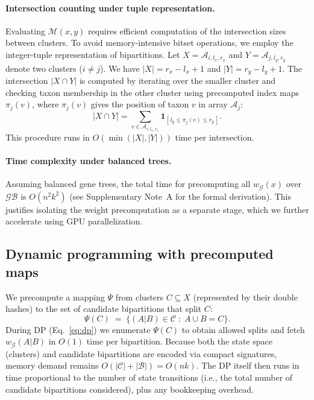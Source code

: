 \documentclass[10pt,a4paper]{article}
\begin{document}
\begin{enumerate}
\paragraph{Intersection counting under tuple representation.}
Evaluating $\mathcal{M}(x,y)$ requires efficient computation of the intersection sizes between clusters.  
To avoid memory-intensive bitset operations, we employ the integer-tuple representation of bipartitions.  
Let $X = \mathcal{A}_{i,l_x,r_x}$ and $Y = \mathcal{A}_{j,l_y,r_y}$ denote two clusters ($i \neq j$).  
We have $|X| = r_x - l_x + 1$ and $|Y| = r_y - l_y + 1$.  
The intersection $|X \cap Y|$ is computed by iterating over the smaller cluster and checking taxon membership in the other cluster using precomputed index maps $\pi_j(v)$, where $\pi_j(v)$ gives the position of taxon $v$ in array $\mathcal{A}_j$:
\[
|X \cap Y| = 
\sum_{v \in \mathcal{A}_{i,l_x,r_x}} 
\mathbf{1}_{[\,l_y \le \pi_j(v) \le r_y\,]}.
\]
This procedure runs in $O(\min(|X|, |Y|))$ time per intersection.

\paragraph{Time complexity under balanced trees.}
Assuming balanced gene trees, the total time for precomputing all $w_{\mathcal{G}}(x)$ over $\mathcal{GB}$ is $O(n^2 k^2)$ (see Supplementary Note~A for the formal derivation).  
This justifies isolating the weight precomputation as a separate stage, which we further accelerate using GPU parallelization.


\subsection{Dynamic programming with precomputed maps}
\label{subsec:dp}

We precompute a mapping $\Psi$ from clusters $C\subseteq X$ (represented by their double hashes) to the set of candidate bipartitions that split $C$:
\[
\Psi(C)\;=\;\{(A\!|\!B)\in\mathcal{C}\;:\;A\cup B=C\}.
\]
During DP (Eq.~\ref{eq:dp}) we enumerate $\Psi(C)$ to obtain allowed splits and fetch $w_{\mathcal{G}}(A\!|\!B)$ in $O(1)$ time per bipartition. Because both the state space (clusters) and candidate bipartitions are encoded via compact signatures, memory demand remains $O(|\mathcal{C}|+|\mathcal{B}|)=O(nk)$. The DP itself then runs in time proportional to the number of state transitions (i.e., the total number of candidate bipartitions considered), plus any bookkeeping overhead.


\end{enumerate}
\end{document}
